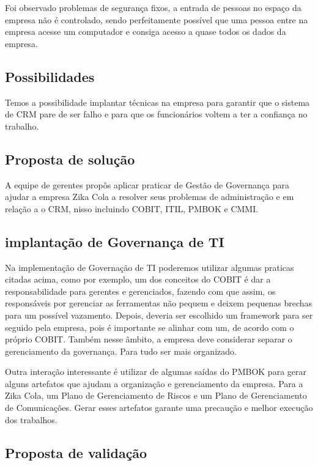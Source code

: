 \documentclass[12pt]{article}
\begin{document}
Foi observado problemas de segurança fixos, a entrada de pessoas no espaço da empresa não é controlado, sendo perfeitamente possível que uma pessoa entre na empresa acesse um computador e consiga acesso a quase todos os dados da empresa. 

\subsection{Possibilidades}

Temos a possibilidade implantar técnicas na empresa para garantir que o sistema de CRM pare de ser falho e para que os funcionários voltem a ter a confiança no trabalho.

\subsection{Proposta de solução}

A equipe de gerentes propôs aplicar praticar de Gestão de Governança para ajudar a empresa Zika Cola a resolver seus problemas de administração e em relação a o CRM, nisso incluindo COBIT, ITIL, PMBOK e CMMI.

\subsection{implantação de Governança de TI}

Na implementação de Governação de TI poderemos utilizar algumas praticas citadas acima, como por exemplo, um dos conceitos do COBIT é dar a responsabilidade para gerentes e gerenciados, fazendo com que assim, os responsáveis por gerenciar as ferramentas não pequem e deixem pequenas brechas para um possível vazamento. Depois, deveria ser escolhido um framework para ser seguido pela empresa, pois é importante se alinhar com um, de acordo com o próprio COBIT. Também nesse âmbito, a empresa deve considerar separar o gerenciamento da governança. Para tudo ser mais organizado.

Outra interação interessante é utilizar de algumas saídas do PMBOK para gerar alguns artefatos que ajudam a organização e gerenciamento da empresa. Para a Zika Cola, um Plano de Gerenciamento de Riscos e um Plano de Gerenciamento de Comunicações. Gerar esses artefatos garante uma precaução e melhor execução dos trabalhos.

\subsection{Proposta de validação}
\end{document}
